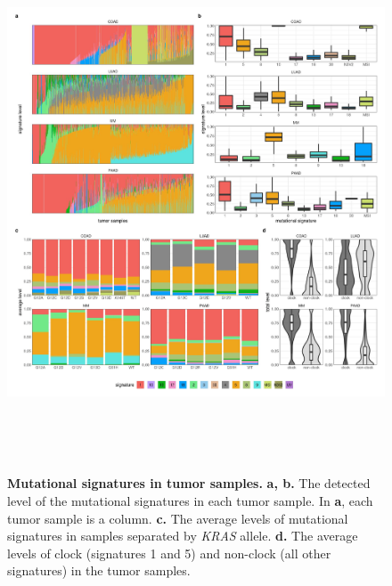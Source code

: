\documentclass[english, 10pt, letterpaper]{article}
\newcommand{\KRAS}{\emph{KRAS}}
\begin{document}
\begin{figure}[p]
\centering
\includegraphics[height=160mm]{figures/SuppFigure_02.jpeg}
\caption{
    \textbf{Mutational signatures in tumor samples.}
    \textbf{a, b.} The detected level of the mutational signatures in each tumor sample. In \textbf{a}, each tumor sample is a column.
    \textbf{c.} The average levels of mutational signatures in samples separated by \KRAS{} allele.
    \textbf{d.} The average levels of clock (signatures 1 and 5) and non-clock (all other signatures) in the tumor samples.
}
\label{sfig:mutational-signatures-summary}
\end{figure}
\end{document}
